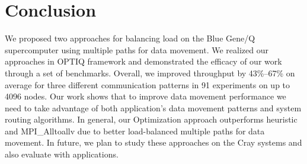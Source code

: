 \section{Conclusion}
\label{sec:conclusion}
We proposed two approaches for balancing load on the Blue Gene/Q supercomputer using multiple paths for data movement. We realized our approaches in OPTIQ framework and demonstrated the efficacy of our work through a set of benchmarks. Overall, we improved throughput by 43\%--67\% on average for three different communication patterns in 91 experiments on up to 4096 nodes. %
Our work shows that to improve data movement performance we need to take advantage of both application's data movement patterns and system routing algorithms. In general, our Optimization approach outperforms heuristic and MPI\_Alltoallv due to better load-balanced multiple paths for data movement. In future, we plan to study these approaches on the Cray systems and  also evaluate with applications.
